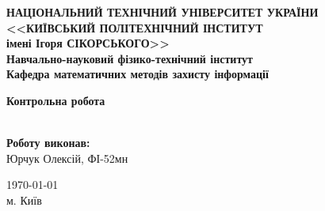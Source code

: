 \thispagestyle{empty}
\linespread{1.1}

\begin{center}
    {\bfseries\large
        НАЦІОНАЛЬНИЙ ТЕХНІЧНИЙ УНІВЕРСИТЕТ УКРАЇНИ \\
        <<КИЇВСЬКИЙ ПОЛІТЕХНІЧНИЙ ІНСТИТУТ \\
        імені Ігоря СІКОРСЬКОГО>> \\
        Навчально-науковий фізико-технічний інститут \\
        \medskip
        Кафедра математичних методів захисту інформації}
\end{center}

\begin{center}
\vspace{40mm}
{\bfseries\huge Контрольна робота} \\
{\bfseries\huge {}} \\
\end{center}

\vspace{55mm}
\begin{center}
    \hfill
    \begin{minipage}[t]{0.4\textwidth}
        \begin{flushright}
            \textbf{Роботу виконав:} \\
            Юрчук Олексій, ФІ-52мн
        \end{flushright}
    \end{minipage}
\end{center}

\vfill
\begin{center}
    \today \\
    {м. Київ}
\end{center}

\newpage
{}
